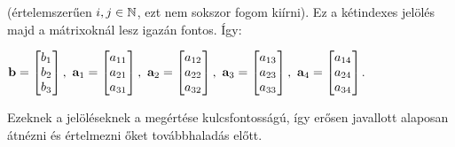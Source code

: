 \documentclass[a4paper,11.5pt]{article}
\begin{document}
	\noindent (értelemszerűen $i,j \in \mathbb{N}$, ezt nem sokszor fogom kiírni). Ez a kétindexes jelölés majd a mátrixoknál lesz igazán fontos. Így:
	\begin{center}
		$\b =
		\begin{bmatrix}
		b_{1}\s \\
		b_{2}\s \\
		b_{3}\s \\
		\end{bmatrix},~
		\a_{1} =
		\begin{bmatrix}
		a_{11}\s \\
		a_{21}\s \\
		a_{31}\s \\
		\end{bmatrix},~
		\a_{2} =
		\begin{bmatrix}
		a_{12}\s \\
		a_{22}\s \\
		a_{32}\s \\
		\end{bmatrix},~
		\a_{3} =
		\begin{bmatrix}
		a_{13}\s \\
		a_{23}\s \\
		a_{33}\s \\
		\end{bmatrix},~
		\a_{4} =
		\begin{bmatrix}
		a_{14}\s \\
		a_{24}\s \\
		a_{34}\s \\
		\end{bmatrix}$.
	\end{center}
	
	\noindent Ezeknek a jelöléseknek a megértése kulcsfontosságú, így erősen javallott alaposan átnézni és értelmezni őket továbbhaladás előtt.
	
\end{document}
